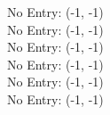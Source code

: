 No Entry: (-1, -1) \\
No Entry: (-1, -1) \\
No Entry: (-1, -1) \\
No Entry: (-1, -1) \\
No Entry: (-1, -1) \\
No Entry: (-1, -1) \\